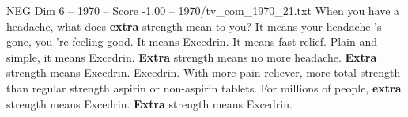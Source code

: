 \begin{textsample}{NEG Dim 6 – 1970 – Score -1.00 – 1970/tv\_com\_1970\_21.txt}  \label{ex:f6_neg_069}
When you have a headache, what does \textbf{extra} strength mean to you?
It means your headache 's gone, you 're feeling good.
It means Excedrin.
It means fast relief.
Plain and simple, it means Excedrin. \textbf{Extra} strength means no more headache. \textbf{Extra} strength means Excedrin.
Excedrin.
With more pain reliever, more total strength than regular strength aspirin or non-aspirin tablets.
For millions of people, \textbf{extra} strength means Excedrin. \textbf{Extra} strength means Excedrin.

\end{textsample}
